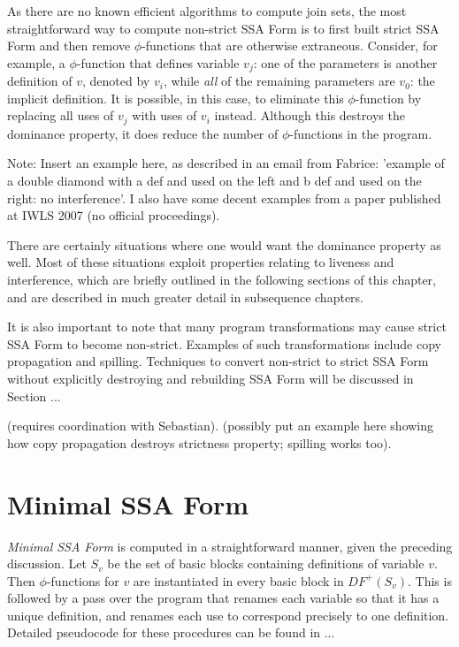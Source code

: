 As there are no known efficient algorithms to compute join sets, the
most straightforward way to compute non-strict SSA Form is to first
built strict SSA Form and then remove $\phi$-functions that are 
otherwise extraneous. Consider, for example, a $\phi$-function that
defines variable $v_{j}$: one of the parameters is another definition of
$v$, denoted by $v_{i}$, while \emph{all} of the remaining parameters 
are $v_{0}$: the implicit definition. It is possible, in this case, to
eliminate this $\phi$-function by replacing all uses of $v_{j}$ with
uses of $v_{i}$ instead. Although this destroys the dominance property,
it does reduce the number of $\phi$-functions in the program. 

Note: Insert an example here, as described in an email from Fabrice:
'example of a double diamond with a def and used on the left and b def 
and used on the right: no interference'. I also have some decent examples
from a paper published at IWLS 2007 (no official proceedings). 

There are certainly situations where one would want the dominance property
as well. Most of these situations exploit properties relating to liveness
and interference, which are briefly outlined in the following sections 
of this chapter, and are described in much greater detail in subsequence
chapters. 

It is also important to note that many program transformations may
cause strict SSA Form to become non-strict. Examples of such transformations
include copy propagation and spilling. Techniques to convert non-strict
to strict SSA Form without explicitly destroying and rebuilding SSA 
Form will be discussed in Section ...

(requires coordination with Sebastian).
(possibly put an example here showing how copy propagation destroys
strictness property; spilling works too). 

\section{Minimal SSA Form}

\emph{Minimal SSA Form} is computed in a straightforward manner,
given the preceding discussion. Let $S_{v}$ be the set of
basic blocks containing definitions of variable $v$. Then
$\phi$-functions for $v$ are instantiated in every basic
block in $DF^{+}(S_{v})$. This is followed by a pass over
the program that renames each variable so that it has a
unique definition, and renames each use to correspond
precisely to one definition. Detailed pseudocode for these
procedures can be found in ... 

